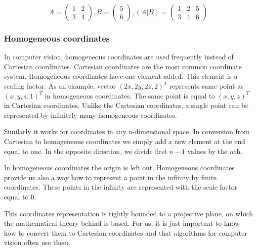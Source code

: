 \[
A = \begin{pmatrix}
        1 & 2 \\
        3 & 4
\end{pmatrix},
B = \begin{pmatrix}
5 \\
6
\end{pmatrix},
(A|B) = \begin{pmatrix}
        1 & 2 & 5 \\
        3 & 4 & 6
\end{pmatrix}
\]

\subsubsection*{Homogeneous coordinates}

In computer vision, homogeneous coordinates are used frequently instead of
Cartesian coordinates. Cartesian coordinates are the most common coordinate
system.  Homogeneous coordinates have one element added. This element is a
scaling factor. As an example, vector $(2x, 2y, 2z, 2)^T$ represents same point
as $(x, y, z, 1)^T$ in homogeneous coordinates. The same point is equal to $(x,
y, z)^T$ in Cartesian coordinates. Unlike the Cartesian coordinates, a single
point can be represented by infinitely many homogeneous coordinates.

Similarly it works for coordinates in any n-dimensional space. In conversion
from Cartesian to homogeneous coordinates we simply add a new element at the end
equal to one. In the opposite direction, we divide first $n-1$ values by the
$n$th.

In homogeneous coordinates the origin is left out. Homogeneous coordinates provide
us also a way how to represent a point in the infinity by finite coordinates.
These points in the infinity are represented with the scale factor equal to 0.

This coordinates representation is tightly bounded to a projective plane, on
which the mathematical theory behind is based. For us, it is just important to
know how to convert them to Cartesian coordinates and that algorithms for
computer vision often use them.

